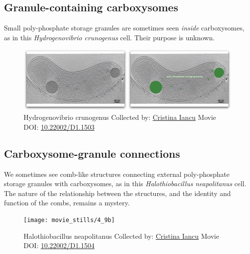\documentclass[]{tufte-book}
\begin{document}
\hypertarget{Granule-containing_carboxysomes}{\subsection{Granule-containing
carboxysomes}\label{Granule-containing_carboxysomes}}

Small poly-phosphate storage granules are sometimes seen \emph{inside}
carboxysomes, as in this \emph{Hydrogenovibrio crunogenus} cell. Their
purpose is unknown.





\begin{figure}
\includegraphics{movie_stills/4_9a} \caption[Hydrogenovibrio crunogenus Collected by:
\protect\hyperlink{cristina_iancu}{Cristina Iancu} Movie DOI:
\href{https://doi.org/10.22002/D1.1503}{10.22002/D1.1503}]{Hydrogenovibrio crunogenus Collected by:
\protect\hyperlink{cristina_iancu}{Cristina Iancu} Movie DOI:
\href{https://doi.org/10.22002/D1.1503}{10.22002/D1.1503}}\label{fig:4-9a}
\end{figure}

\hypertarget{Carboxysome-granule_connections}{\subsection{Carboxysome-granule
connections}\label{Carboxysome-granule_connections}}

We sometimes see comb-like structures connecting external poly-phosphate
storage granules with carboxysomes, as in this \emph{Halothiobacillus
neapolitanus} cell. The nature of the relationship between the
structures, and the identity and function of the combs, remains a
mystery.





\begin{figure}
\texttt{[image: movie\_stills/4\_9b]} \caption[Halothiobacillus neapolitanus Collected by:
\protect\hyperlink{cristina_iancu}{Cristina Iancu} Movie DOI:
\href{https://doi.org/10.22002/D1.1504}{10.22002/D1.1504}]{Halothiobacillus neapolitanus Collected by:
\protect\hyperlink{cristina_iancu}{Cristina Iancu} Movie DOI:
\href{https://doi.org/10.22002/D1.1504}{10.22002/D1.1504}}\label{fig:4-9b}
\end{figure}
\end{document}

